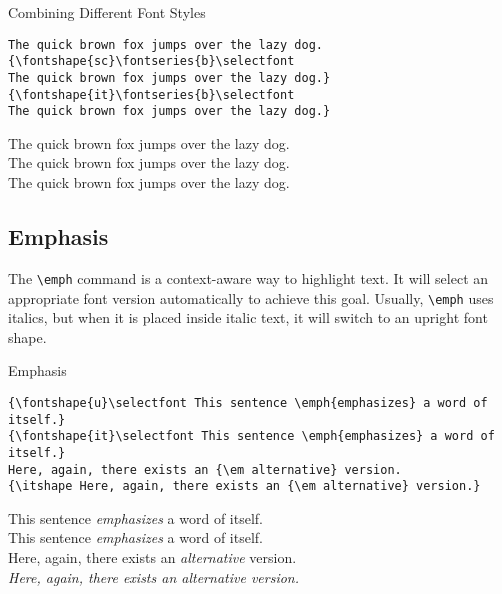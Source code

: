 \documentclass[a4paper,oneside,11pt]{article}
\newcommand\comm[1]{\texttt{\textbackslash#1}}
\begin{document}
\begin{titled-frame}
{\textsf{Combining Different Font Styles}}
\vspace{-1em}
\begin{verbatim}
The quick brown fox jumps over the lazy dog.
{\fontshape{sc}\fontseries{b}\selectfont
The quick brown fox jumps over the lazy dog.}
{\fontshape{it}\fontseries{b}\selectfont
The quick brown fox jumps over the lazy dog.}
\end{verbatim}

\noindent The quick brown fox jumps over the lazy dog.\\
{\selectfont
The quick brown fox jumps over the lazy dog.}\\
{\selectfont
The quick brown fox jumps over the lazy dog.}
\end{titled-frame}

\subsection{Emphasis}

The  \comm{emph}  command  is  a   context-aware  way  to  highlight  text. It
will  select  an  appropriate  font  version  automatically  to  achieve  this
goal. Usually, \comm{emph} uses  italics, but when it is  placed inside italic
text, it will switch to an upright font shape.

\begin{titled-frame}
{\textsf{Emphasis}}
\vspace{-1em}
\small
\begin{verbatim}
{\fontshape{u}\selectfont This sentence \emph{emphasizes} a word of itself.}
{\fontshape{it}\selectfont This sentence \emph{emphasizes} a word of itself.}
Here, again, there exists an {\em alternative} version.
{\itshape Here, again, there exists an {\em alternative} version.}
\end{verbatim}
\normalsize
{\selectfont This sentence \emph{emphasizes} a word of itself.}\\
{\selectfont This sentence \emph{emphasizes} a word of itself.}\\
Here, again, there exists an {\em alternative} version.\\
{\itshape Here, again, there exists an {\em alternative} version.}
\end{titled-frame}
\end{document}
